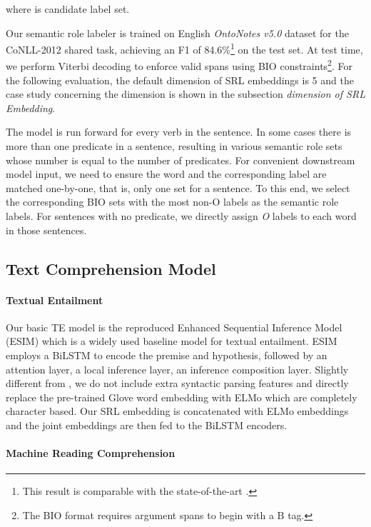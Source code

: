 \documentclass[11pt]{article}
\begin{document}
where  is candidate label set.

Our semantic role labeler is trained on English \emph{OntoNotes v5.0} dataset \citep{pradhan2013towards}  for the CoNLL-2012 shared task, achieving an F1 of 84.6\%\footnote{This result is comparable with the state-of-the-art \citep{li2019dependency}.} on the test set. At test time, we perform Viterbi decoding to enforce valid spans using BIO constraints\footnote{The BIO format requires argument spans to begin with a B tag.}. For the following evaluation, the default dimension of SRL embeddings is 5 and the case study concerning the dimension is shown in the subsection \emph{dimension of SRL Embedding}.

The model is run forward for every verb in the sentence.  In some cases there is more than one predicate in a sentence, resulting in various semantic role sets whose number is equal to the number of predicates. For convenient downstream model input, we need to ensure the word and the corresponding label are matched one-by-one, that is, only one set for a sentence. To this end, we select the corresponding BIO sets with the most non-O labels as the semantic role labels. For sentences with no predicate, we directly assign \emph{O} labels to each word in those sentences. 

\subsection{Text Comprehension Model}
\paragraph{Textual Entailment} Our basic TE model is the reproduced Enhanced Sequential Inference Model (ESIM) \citep{Chen2017Enhanced} which is a widely used baseline model for textual entailment. ESIM employs a BiLSTM to encode the premise and hypothesis, followed by an attention layer, a local inference layer, an inference composition layer. Slightly different from \citep{Chen2017Enhanced}, we do not include extra syntactic parsing features and directly replace the pre-trained Glove word embedding with ELMo which are completely character based. Our SRL embedding is concatenated with ELMo embeddings and the joint embeddings are then fed to the BiLSTM encoders. 

\paragraph{Machine Reading Comprehension}
\end{document}
